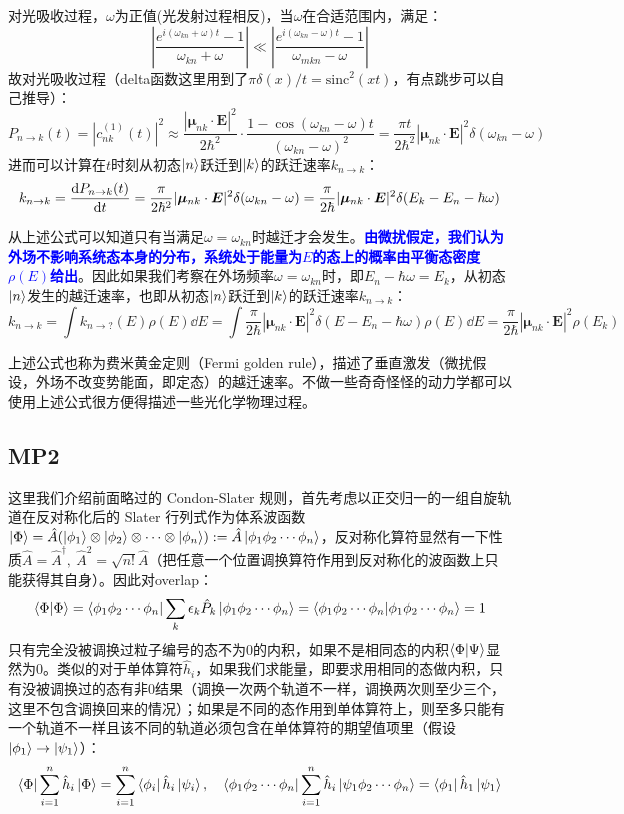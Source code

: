 对光吸收过程，$\omega$为正值(光发射过程相反)，当$\omega$在合适范围内，满足：
\[\left|\frac{e^{i(\omega_{kn}+\omega)t}-1}{\omega_{kn} + \omega}\right| \ll \left|\frac{e^{i(\omega_{kn}-\omega)t}-1}{\omega_{mkn}-\omega}\right|\]
故对光吸收过程（delta函数这里用到了$\pi\delta(x)/t=\mathrm{sinc}^2(xt)$，有点跳步可以自己推导）：
\[P_{n \to k}(t)=|c_{nk}^{(1)}(t)|^2\approx\frac{|\bm{\mu}_{nk}\cdot\bm{E}|^2}{2\hbar^2}\cdot\frac{1-\cos{(\omega_{kn}-\omega)t}}{(\omega_{kn}-\omega)^2}=\frac{\pi t}{2\hbar^2}|\bm{\mu}_{nk}\cdot\bm{E}|^2\delta(\omega_{kn}-\omega)\]
进而可以计算在$t$时刻从初态$\ket{n}$跃迁到$\ket{k}$的跃迁速率$k_{n \to k}$：
\[k_{n \to k}=\dv{P_{n \to k}(t)}{t}=\frac{\pi}{2\hbar^2}|\bm{\mu}_{nk}\cdot\bm{E}|^2\delta(\omega_{kn}-\omega)=\frac{\pi}{2\hbar}|\bm{\mu}_{nk}\cdot\bm{E}|^2\delta(E_k-E_n-\hbar\omega)\]

从上述公式可以知道只有当满足$\omega=\omega_{kn}$时越迁才会发生。\textcolor{blue}{\textbf{由微扰假定，我们认为外场不影响系统态本身的分布，系统处于能量为$E$的态上的概率由平衡态密度$\rho(E)$给出}}。因此如果我们考察在外场频率$\omega=\omega_{kn}$时，即$E_n-\hbar\omega=E_k$，从初态$\ket{n}$发生的越迁速率，也即从初态$\ket{n}$跃迁到$\ket{k}$的跃迁速率$k_{n \to k}$：
\[k_{n \to k}=\int k_{n \to ?}(E)\rho(E)\dd{E}=\int \frac{\pi}{2\hbar}|\bm{\mu}_{nk}\cdot\bm{E}|^2\delta(E-E_n-\hbar\omega)\rho(E)\dd{E}=\frac{\pi}{2\hbar}|\bm{\mu}_{nk}\cdot\bm{E}|^2\rho(E_k)\]

上述公式也称为费米黄金定则（Fermi golden rule），描述了垂直激发（微扰假设，外场不改变势能面，即定态）的越迁速率。不做一些奇奇怪怪的动力学都可以使用上述公式很方便得描述一些光化学物理过程。

\subsection{MP2}
这里我们介绍前面略过的 Condon-Slater 规则，首先考虑以正交归一的一组自旋轨道在反对称化后的 Slater 行列式作为体系波函数$\ket{\Phi}=\hat{A}(\ket{\phi_1}\otimes\ket{\phi_2}\otimes\cdots\otimes\ket{\phi_n}):=\hat{A}\ket{\phi_1\phi_2\cdots\phi_n}$，反对称化算符显然有一下性质$\hat{A}=\hat{A}^{\dagger}, \ \hat{A}^2=\sqrt{n!}\hat{A}$（把任意一个位置调换算符作用到反对称化的波函数上只能获得其自身）。因此对overlap：
\[\bra{\Phi}\ket{\Phi}=\bra{\phi_1\phi_2\cdots\phi_n}\sum_k\epsilon_k\hat{P}_k\ket{\phi_1\phi_2\cdots\phi_n}=\bra{\phi_1\phi_2\cdots\phi_n}\ket{\phi_1\phi_2\cdots\phi_n}=1\]
只有完全没被调换过粒子编号的态不为0的内积，如果不是相同态的内积$\bra{\Phi}\ket{\Psi}$显然为0。类似的对于单体算符$\hat{h}_i$，如果我们求能量，即要求用相同的态做内积，只有没被调换过的态有非0结果（调换一次两个轨道不一样，调换两次则至少三个，这里不包含调换回来的情况）；如果是不同的态作用到单体算符上，则至多只能有一个轨道不一样且该不同的轨道必须包含在单体算符的期望值项里（假设$\ket{\phi_1}\to\ket{\psi_1}$）：
\[\bra{\Phi}\sum_{i=1}^{n}\hat{h}_i\ket{\Phi}=\sum_{i=1}^{n}\bra{\phi_i}\hat{h}_i\ket{\psi_i}, \quad \bra{\phi_1\phi_2\cdots\phi_n}\sum_{i=1}^{n}\hat{h}_i\ket{\psi_1\phi_2\cdots\phi_n}=\bra{\phi_1}\hat{h}_1\ket{\psi_1}\]

